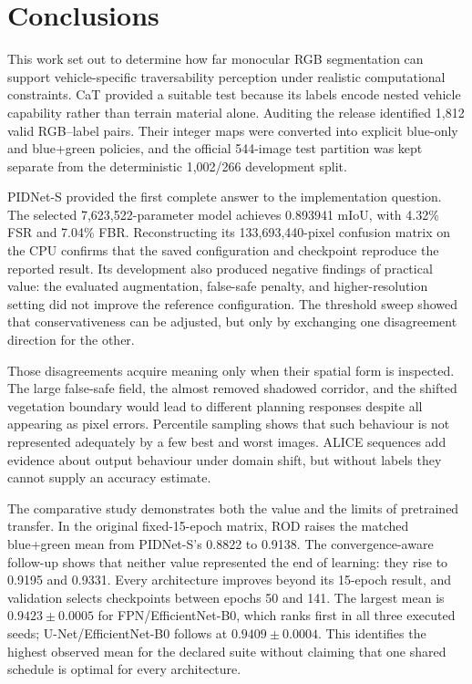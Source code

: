 \chapter{Conclusions}
\label{ch:conclusions}

This work set out to determine how far monocular RGB segmentation can support
vehicle-specific traversability perception under realistic computational
constraints. CaT provided a suitable test because its labels encode nested
vehicle capability rather than terrain material alone. Auditing the release
identified 1,812 valid RGB--label pairs. Their integer maps were converted into
explicit blue-only and blue+green policies, and the official 544-image test
partition was kept separate from the deterministic 1,002/266 development
split.

PIDNet-S provided the first complete answer to the implementation question. The
selected 7,623,522-parameter model achieves 0.893941 mIoU, with 4.32\% FSR and
7.04\% FBR. Reconstructing its 133,693,440-pixel confusion matrix on the CPU
confirms that the saved configuration and checkpoint reproduce the reported
result. Its development also produced negative findings of practical value:
the evaluated augmentation, false-safe penalty, and higher-resolution setting
did not improve the reference configuration. The threshold sweep showed that
conservativeness can be adjusted, but only by exchanging one disagreement
direction for the other.

Those disagreements acquire meaning only when their spatial form is inspected.
The large false-safe field, the almost removed shadowed corridor, and the
shifted vegetation boundary would lead to different planning responses despite
all appearing as pixel errors. Percentile sampling shows that such behaviour
is not represented adequately by a few best and worst images. ALICE sequences
add evidence about output behaviour under domain shift, but without labels
they cannot supply an accuracy estimate.

The comparative study demonstrates both the value and the limits of pretrained
transfer. In the original fixed-15-epoch matrix, ROD raises the matched
blue+green mean from PIDNet-S's 0.8822 to 0.9138. The convergence-aware
follow-up shows that neither value represented the end of learning: they rise
to 0.9195 and 0.9331. Every architecture improves beyond its 15-epoch result,
and validation selects checkpoints between epochs 50 and 141. The largest
mean is $0.9423\pm0.0005$ for FPN/EfficientNet-B0, which ranks first in all
three executed seeds; U-Net/EfficientNet-B0 follows at
$0.9409\pm0.0004$. This identifies the highest observed mean for the declared suite
without claiming that one shared schedule is optimal for every architecture.


